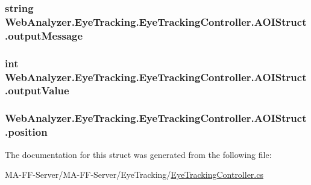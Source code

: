 \subsubsection[{output\+Message}]{\setlength{\rightskip}{0pt plus 5cm}string Web\+Analyzer.\+Eye\+Tracking.\+Eye\+Tracking\+Controller.\+A\+O\+I\+Struct.\+output\+Message}\label{struct_web_analyzer_1_1_eye_tracking_1_1_eye_tracking_controller_1_1_a_o_i_struct_a003358361ea7827329f72d55bee09ddc}
\hypertarget{struct_web_analyzer_1_1_eye_tracking_1_1_eye_tracking_controller_1_1_a_o_i_struct_adc29300e5fb7c65d165375c88494bf20}{}
\subsubsection[{output\+Value}]{\setlength{\rightskip}{0pt plus 5cm}int Web\+Analyzer.\+Eye\+Tracking.\+Eye\+Tracking\+Controller.\+A\+O\+I\+Struct.\+output\+Value}\label{struct_web_analyzer_1_1_eye_tracking_1_1_eye_tracking_controller_1_1_a_o_i_struct_adc29300e5fb7c65d165375c88494bf20}
\hypertarget{struct_web_analyzer_1_1_eye_tracking_1_1_eye_tracking_controller_1_1_a_o_i_struct_afb63f84a1078801a841b45ef824b1117}{}
\subsubsection[{position}]{ Web\+Analyzer.\+Eye\+Tracking.\+Eye\+Tracking\+Controller.\+A\+O\+I\+Struct.\+position}\label{struct_web_analyzer_1_1_eye_tracking_1_1_eye_tracking_controller_1_1_a_o_i_struct_afb63f84a1078801a841b45ef824b1117}


The documentation for this struct was generated from the following file\+:\begin{DoxyCompactItemize}
\item 
M\+A-\/\+F\+F-\/\+Server/\+M\+A-\/\+F\+F-\/\+Server/\+Eye\+Tracking/\hyperlink{_eye_tracking_controller_8cs}{Eye\+Tracking\+Controller.\+cs}\end{DoxyCompactItemize}
